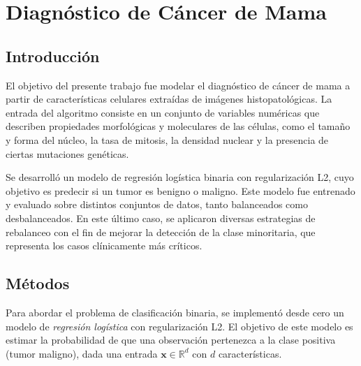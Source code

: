 \section{Diagnóstico de Cáncer de Mama}
\begin{abstract}
    En este trabajo se quiso modelar el diagnóstico de cáncer de mama a partir de características celulares. Para llevarlo a cabo, se desarrolló un modelo de regresión logística binaria con regularización L2 y se evaluaron distintas técnicas de rebalanceo. Se probó utilizando datos balanceados y desbalanceados. El modelo performó correctamente, alcanzando un F-score de 0.93 en datos balanceados y de 0.85 con cost re-weighting. Las métricas mostraron un buen equilibrio entre precisión y recall en ambos casos.
\end{abstract}

\subsection{Introducción}
El objetivo del presente trabajo fue modelar el diagnóstico de cáncer de mama a partir de características celulares extraídas de imágenes histopatológicas. La entrada del algoritmo consiste en un conjunto de variables numéricas que describen propiedades morfológicas y moleculares de las células, como el tamaño y forma del núcleo, la tasa de mitosis, la densidad nuclear y la presencia de ciertas mutaciones genéticas.

Se desarrolló un modelo de regresión logística binaria con regularización L2, cuyo objetivo es predecir si un tumor es benigno o maligno. Este modelo fue entrenado y evaluado sobre distintos conjuntos de datos, tanto balanceados como desbalanceados. En este último caso, se aplicaron diversas estrategias de rebalanceo con el fin de mejorar la detección de la clase minoritaria, que representa los casos clínicamente más críticos.

\subsection{Métodos}

Para abordar el problema de clasificación binaria, se implementó desde cero un modelo de \textit{regresión logística} con regularización L2. El objetivo de este modelo es estimar la probabilidad de que una observación pertenezca a la clase positiva (tumor maligno), dada una entrada $\mathbf{x} \in \mathbb{R}^d$ con $d$ características.

